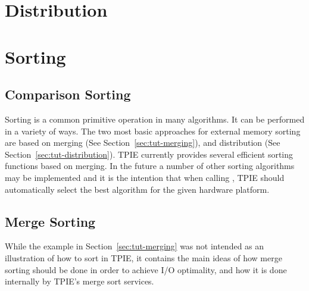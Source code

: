 
\section{Distribution} 

\tobewritten


%


\section{Sorting}
\label{sec:tut-sorting}
\subsection{Comparison Sorting} 

Sorting is a common primitive operation in many algorithms.
It can be performed in a variety of ways. The two most basic
approaches for external memory sorting are based on merging
(See Section~\ref{sec:tut-merging}), and distribution (See
Section~\ref{sec:tut-distribution}).
TPIE currently provides several efficient sorting functions
based on merging.  In the future a number of other sorting
algorithms may be implemented and it is the intention that
when calling , TPIE should automatically
select the best algorithm for the given hardware platform.

\subsection{Merge Sorting} 
While the  example in
Section~\ref{sec:tut-merging} was not intended as an
illustration of how to sort in TPIE, it contains the main
ideas of how merge sorting should be done in order to
achieve I/O optimality, and how it is done internally by
TPIE's merge sort services.

